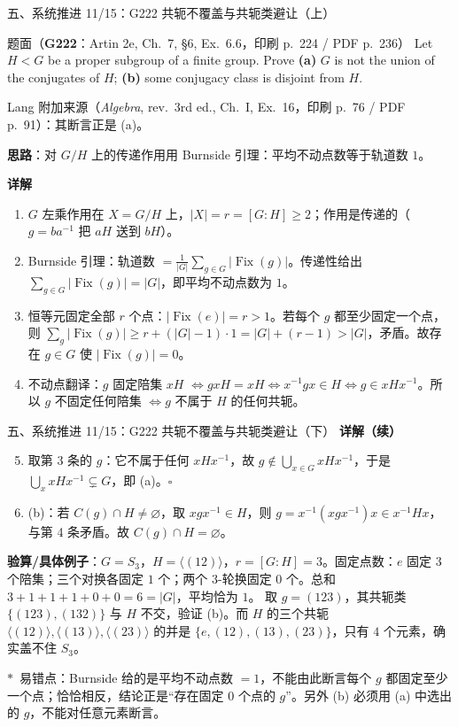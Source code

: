 \documentclass[aspectratio=169,10pt,fontset=none]{ctexbeamer}
\newcommand{\ex}[1]{\textcolor{accent}{\footnotesize\bfseries #1}}
\newcommand{\key}[1]{\textcolor{ink}{\bfseries #1}}
\newcommand{\starpt}{\textcolor{accent}{\bfseries$\ast$}}
\begin{document}
\begin{frame}[t]{五、系统推进 11/15：G222 共轭不覆盖与共轭类避让（上）}
\label{ex:G222}\leavevmode
\scriptsize
\begin{block}{\footnotesize 题面（\ex{G222}：Artin 2e, Ch.~7, \S6, Ex.~6.6，印刷 p.~224 / PDF p.~236）}
Let $H<G$ be a proper subgroup of a finite group. Prove \textbf{(a)} $G$ is not the union of the conjugates of $H$; \textbf{(b)} some conjugacy class is disjoint from $H$.

Lang 附加来源（\textit{Algebra}, rev.\ 3rd ed., Ch.~I, Ex.~16，印刷 p.~76 / PDF p.~91）：其断言正是 (a)。
\end{block}
\key{思路}：对 $G/H$ 上的传递作用用 Burnside 引理：平均不动点数等于轨道数 $1$。

\key{详解}
\begin{enumerate}
  \item $G$ 左乘作用在 $X=G/H$ 上，$|X|=r=[G:H]\ge2$；作用是传递的（$g=ba^{-1}$ 把 $aH$ 送到 $bH$）。
  \item Burnside 引理：轨道数 $=\frac{1}{|G|}\sum_{g\in G}|\operatorname{Fix}(g)|$。传递性给出 $\sum_{g\in G}|\operatorname{Fix}(g)|=|G|$，即平均不动点数为 $1$。
  \item 恒等元固定全部 $r$ 个点：$|\operatorname{Fix}(e)|=r>1$。若每个 $g$ 都至少固定一个点，则 $\sum_{g}|\operatorname{Fix}(g)|\ge r+(|G|-1)\cdot1=|G|+(r-1)>|G|$，矛盾。故存在 $g\in G$ 使 $|\operatorname{Fix}(g)|=0$。
  \item 不动点翻译：$g$ 固定陪集 $xH$ $\iff gxH=xH\iff x^{-1}gx\in H\iff g\in xHx^{-1}$。所以 $g$ 不固定任何陪集 $\iff g$ 不属于 $H$ 的任何共轭。
\end{enumerate}
\end{frame}

\begin{frame}[t]{五、系统推进 11/15：G222 共轭不覆盖与共轭类避让（下）}
\scriptsize
\key{详解（续）}
\begin{enumerate}
  \setcounter{enumi}{4}
  \item 取第 3 条的 $g$：它不属于任何 $xHx^{-1}$，故 $g\notin\bigcup_{x\in G}xHx^{-1}$，于是 $\bigcup_x xHx^{-1}\subsetneq G$，即 (a)。$\square$
  \item (b)：若 $C(g)\cap H\ne\varnothing$，取 $xgx^{-1}\in H$，则 $g=x^{-1}(xgx^{-1})x\in x^{-1}Hx$，与第 4 条矛盾。故 $C(g)\cap H=\varnothing$。
\end{enumerate}
\key{验算/具体例子}：$G=S_3$，$H=\langle(12)\rangle$，$r=[G:H]=3$。固定点数：$e$ 固定 $3$ 个陪集；三个对换各固定 $1$ 个；两个 $3$-轮换固定 $0$ 个。总和 $3+1+1+1+0+0=6=|G|$，平均恰为 $1$。
取 $g=(123)$，其共轭类 $\{(123),(132)\}$ 与 $H$ 不交，验证 (b)。而 $H$ 的三个共轭 $\langle(12)\rangle,\langle(13)\rangle,\langle(23)\rangle$ 的并是 $\{e,(12),(13),(23)\}$，只有 $4$ 个元素，确实盖不住 $S_3$。

\starpt~易错点：Burnside 给的是平均不动点数 $=1$，不能由此断言每个 $g$ 都固定至少一个点；恰恰相反，结论正是“存在固定 $0$ 个点的 $g$”。另外 (b) 必须用 (a) 中选出的 $g$，不能对任意元素断言。
\end{frame}
\end{document}
